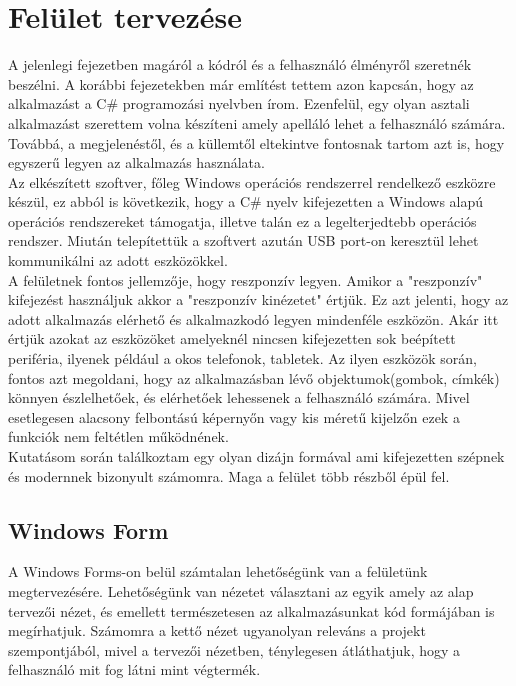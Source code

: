 \documentclass[tocnopagenum]{thesis-ekf}
\theoremstyle{definition}
\theoremstyle{remark}
\begin{document}
	\section{Felület tervezése}
	A jelenlegi fejezetben magáról a kódról és a felhasználó élményről szeretnék beszélni.
	A korábbi fejezetekben már említést tettem azon kapcsán, hogy az alkalmazást a C\# programozási nyelvben írom. Ezenfelül, egy olyan asztali alkalmazást szerettem volna készíteni amely apelláló lehet a felhasználó számára. Továbbá, a megjelenéstől, és a küllemtől eltekintve fontosnak tartom azt is, hogy egyszerű legyen az alkalmazás használata.
	\\
	Az elkészített szoftver, főleg Windows operációs rendszerrel rendelkező eszközre készül, ez abból is következik, hogy a C\# nyelv kifejezetten a Windows alapú operációs rendszereket támogatja, illetve talán ez a legelterjedtebb operációs rendszer.
	Miután telepítettük a szoftvert azután USB port-on keresztül lehet kommunikálni az adott eszközökkel.
	\\
	A felületnek fontos jellemzője, hogy reszponzív legyen. Amikor a "reszponzív" kifejezést használjuk akkor a "reszponzív kinézetet" értjük. Ez azt jelenti, hogy az adott alkalmazás elérhető és alkalmazkodó legyen mindenféle eszközön. Akár itt értjük azokat az eszközöket amelyeknél nincsen kifejezetten sok beépített periféria, ilyenek például a okos telefonok, tabletek. Az ilyen eszközök során, fontos azt megoldani, hogy az alkalmazásban lévő objektumok(gombok, címkék) könnyen észlelhetőek, és elérhetőek lehessenek a felhasználó számára. 
	Mivel esetlegesen alacsony felbontású képernyőn vagy kis méretű kijelzőn ezek a funkciók nem feltétlen működnének. 
	\\
	Kutatásom során találkoztam egy olyan dizájn formával ami kifejezetten szépnek és modernnek bizonyult számomra.\cite{modernUI} 
	Maga a felület több részből épül fel.
	\\
	\subsection*{Windows Form}
	A Windows Forms-on belül számtalan lehetőségünk van a felületünk megtervezésére. Lehetőségünk van nézetet választani az egyik amely az alap tervezői nézet, és emellett természetesen az alkalmazásunkat kód formájában is megírhatjuk. Számomra a kettő nézet ugyanolyan releváns a projekt szempontjából, mivel a tervezői nézetben, ténylegesen átláthatjuk, hogy a felhasználó mit fog látni mint végtermék.
	
\end{document}
